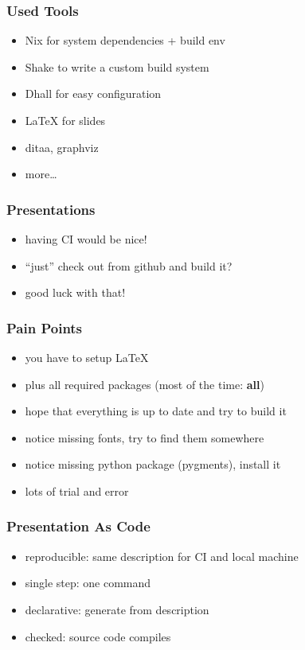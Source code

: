 \documentclass{beamer}
\begin{document}
\begin{frame}
  \frametitle{Used Tools}
  \begin{itemize}
  \item Nix for system dependencies + build env
  \item Shake to write a custom build system
  \item Dhall for easy configuration
  \item LaTeX for slides
  \item ditaa, graphviz
  \item more\ldots
  \end{itemize}
\end{frame}

\begin{frame}
  \frametitle{Presentations}
  \begin{itemize}
  \item having CI would be nice!
  \item ``just'' check out from github and build it?
  \item good luck with that!
  \end{itemize}
\end{frame}

\begin{frame}
  \frametitle{Pain Points}
  \begin{itemize}
  \item you have to setup LaTeX
  \item plus all required packages (most of the time: \textbf{all})
  \item hope that everything is up to date and try to build it
  \item notice missing fonts, try to find them somewhere
  \item notice missing python package (pygments), install it
  \item lots of trial and error
  \end{itemize}
\end{frame}

\begin{frame}
  \frametitle{Presentation As Code}
  \begin{itemize}
  \item reproducible: same description for CI and local machine
  \item single step: one command
  \item declarative: generate from description
  \item checked: source code compiles
  \end{itemize}
\end{frame}
\end{document}
